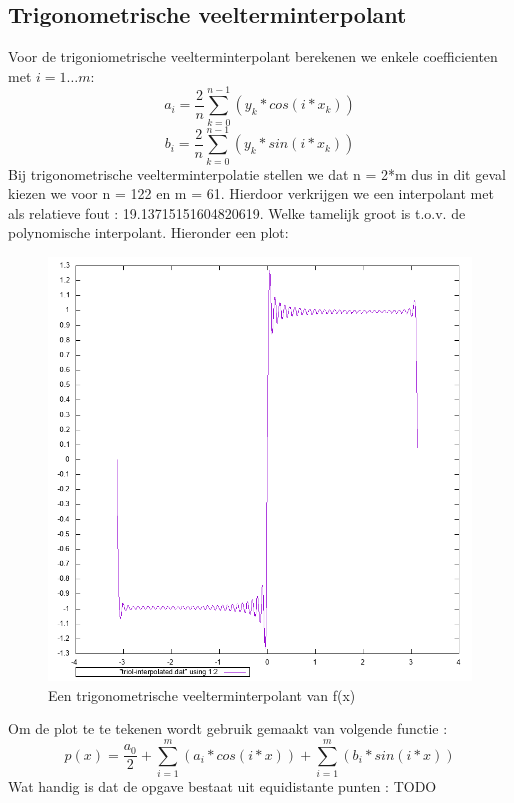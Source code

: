 \documentclass[10pt,a4paper]{article}
\begin{document}
\subsection{Trigonometrische veelterminterpolant}
Voor de trigoniometrische veelterminterpolant berekenen we enkele coefficienten met $i = 1 \hdots m$:
$$
a_{i} = \frac{2}{n}\sum^{n - 1}_{k = 0}(y_{k}*cos(i * x_{k})) 
$$
$$
b_{i} = \frac{2}{n}\sum^{n - 1}_{k = 0}(y_{k}*sin(i * x_{k})) 
$$
Bij trigonometrische veelterminterpolatie stellen we dat n = 2*m dus in dit geval kiezen we voor n = 122 en m = 61. Hierdoor verkrijgen we een interpolant met als relatieve fout : 19.13715151604820619. Welke tamelijk groot is t.o.v. de polynomische interpolant. Hieronder een plot:
\begin{figure}[H]
\centering
\includegraphics[scale=0.3]{../Twographs/trioI-interpolated}
\caption{Een trigonometrische veelterminterpolant van f(x)}
\end{figure}
\begin{figure}[H]
\end{figure}
Om de plot te te tekenen wordt gebruik gemaakt van volgende functie : 
$$
p(x) = \frac{a_{0}}{2} + \sum_{i = 1}^{m}(a_{i} * cos(i * x)) + \sum_{i = 1}^{m}(b_{i} * sin(i * x))
$$ 
Wat handig is dat de opgave bestaat uit equidistante punten : TODO
\end{document}
